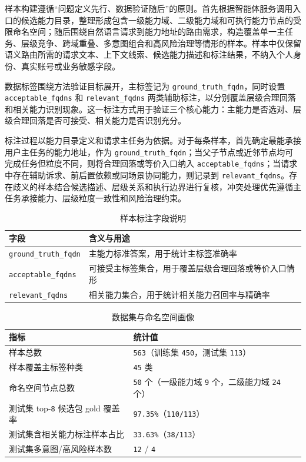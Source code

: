 \documentclass[10pt,a4paper,twocolumn,fontset=fandol]{ctexart}
\begin{document}
样本构建遵循“问题定义先行、数据验证随后”的原则。首先根据智能体服务调用入口的候选能力目录，整理形成包含一级能力域、二级能力域和可执行能力节点的受限命名空间；随后围绕自然语言请求到能力地址的路由需求，构造覆盖单一主任务、层级竞争、跨域重叠、多意图组合和高风险治理等情形的样本。样本中仅保留语义路由所需的请求文本、上下文线索、候选能力描述和标注结果，不纳入个人身份、真实账号或业务敏感字段。

数据标签围绕方法验证目标展开，主标签记为 \texttt{ground\_truth\_fqdn}，同时设置 \texttt{acceptable\_fqdns} 和 \texttt{relevant\_fqdns} 两类辅助标注，以分别覆盖层级合理回落和相关能力识别现象。这一标注方式用于验证三个核心能力：主能力是否选对、层级合理回落是否可接受、相关能力是否识别充分。

标注过程以能力目录定义和请求主任务为依据。对于每条样本，首先确定最能承接用户主任务的能力地址，作为 \texttt{ground\_truth\_fqdn}；当父子节点或近邻节点均可完成任务但粒度不同，则将合理回落或等价入口纳入 \texttt{acceptable\_fqdns}；当请求中存在辅助诉求、前后置依赖或同场景协同能力，则记录到 \texttt{relevant\_fqdns}。存在歧义的样本结合候选描述、层级关系和执行边界进行复核，冲突处理优先遵循主任务承接能力、层级粒度一致性和风险治理约束。

\begin{table}[htbp]
\centering
\caption{样本标注字段说明}
\label{tab:labels}
\small
\begin{tabularx}{\columnwidth}{lY}
\toprule
字段 & 含义与用途 \\
\midrule
\texttt{ground\_truth\_fqdn} & 主能力标准答案，用于统计主标签准确率 \\
\texttt{acceptable\_fqdns} & 可接受主标签集合，用于覆盖层级合理回落或等价入口情形 \\
\texttt{relevant\_fqdns} & 相关能力集合，用于统计相关能力召回率与精确率 \\
\bottomrule
\end{tabularx}
\end{table}

\begin{table}[htbp]
\centering
\caption{数据集与命名空间画像}
\label{tab:profile}
\small
\begin{tabularx}{\columnwidth}{lY}
\toprule
指标 & 统计值 \\
\midrule
样本总数 & \texttt{563}（训练集 \texttt{450}，测试集 \texttt{113}） \\
样本覆盖主标签种类 & \texttt{45} 类 \\
命名空间节点总数 & \texttt{50} 个（一级能力域 \texttt{9} 个，二级能力域 \texttt{24} 个） \\
测试集 top-\texttt{8} 候选包 gold 覆盖率 & \texttt{97.35\%}（\texttt{110/113}） \\
测试集含相关能力标注样本占比 & \texttt{33.63\%}（\texttt{38/113}） \\
测试集多意图/高风险样本数 & \texttt{12} / \texttt{4} \\
\bottomrule
\end{tabularx}
\end{table}
\end{document}
